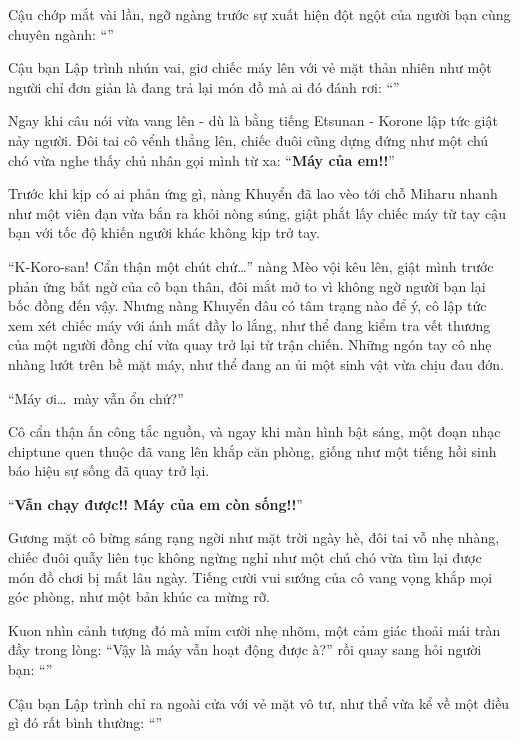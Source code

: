 \documentclass[../main.tex]{subfiles}
\begin{document}
Cậu chớp mắt vài lần, ngỡ ngàng trước sự xuất hiện đột ngột của người bạn cùng chuyên ngành: ``''

Cậu bạn Lập trình nhún vai, giơ chiếc máy lên với vẻ mặt thản nhiên như một người chỉ đơn giản là đang trả lại món đồ mà ai đó đánh rơi: ``''

Ngay khi câu nói vừa vang lên - dù là bằng tiếng Etsunan - Korone lập tức giật nảy người. Đôi tai cô vểnh thẳng lên, chiếc đuôi cũng dựng đứng như một chú chó vừa nghe thấy chủ nhân gọi mình từ xa: ``\textbf{Máy của em!!}''

Trước khi kịp có ai phản ứng gì, nàng Khuyển đã lao vèo tới chỗ Miharu nhanh như một viên đạn vừa bắn ra khỏi nòng súng, giật phắt lấy chiếc máy từ tay cậu bạn với tốc độ khiến người khác không kịp trở tay.

``K-Koro-san! Cẩn thận một chút chứ\dots'' nàng Mèo vội kêu lên, giật mình trước phản ứng bất ngờ của cô bạn thân, đôi mắt mở to vì không ngờ người bạn lại bốc đồng đến vậy. Nhưng nàng Khuyển đâu có tâm trạng nào để ý, cô lập tức xem xét chiếc máy với ánh mắt đầy lo lắng, như thể đang kiểm tra vết thương của một người đồng chí vừa quay trở lại từ trận chiến. Những ngón tay cô nhẹ nhàng lướt trên bề mặt máy, như thể đang an ủi một sinh vật vừa chịu đau đớn.

``Máy ơi\dots\ mày vẫn ổn chứ?''

Cô cẩn thận ấn công tắc nguồn, và ngay khi màn hình bật sáng, một đoạn nhạc chiptune quen thuộc đã vang lên khắp căn phòng, giống như một tiếng hồi sinh báo hiệu sự sống đã quay trở lại.

``\textbf{Vẫn chạy được!! Máy của em còn sống!!}''

Gương mặt cô bừng sáng rạng ngời như mặt trời ngày hè, đôi tai vỗ nhẹ nhàng, chiếc đuôi quẫy liên tục không ngừng nghỉ như một chú chó vừa tìm lại được món đồ chơi bị mất lâu ngày. Tiếng cười vui sướng của cô vang vọng khắp mọi góc phòng, như một bản khúc ca mừng rỡ.

Kuon nhìn cảnh tượng đó mà mỉm cười nhẹ nhõm, một cảm giác thoải mái tràn đầy trong lòng: ``Vậy là máy vẫn hoạt động được à?'' rồi quay sang hỏi người bạn: ``''

Cậu bạn Lập trình chỉ ra ngoài cửa với vẻ mặt vô tư, như thể vừa kể về một điều gì đó rất bình thường: ``''
\end{document}
